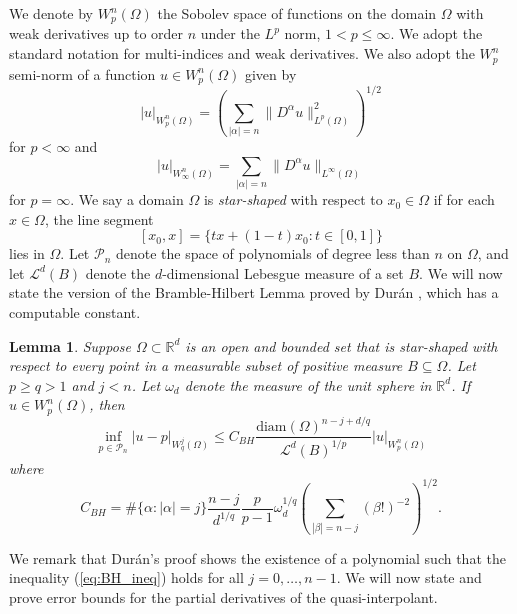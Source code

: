 \documentclass[10pt]{article}
\newtheorem{lemma}[theorem]{Lemma}
\theoremstyle{definition}
\numberwithin{equation}{section}
\numberwithin{figure}{section}
\numberwithin{table}{section}
\begin{document}
We denote by $W^{n}_p(\Omega)$ the Sobolev space of functions on the domain $\Omega$ with weak derivatives up to order $n$ under the $L^p$ norm, $1<p\leq\infty$. We adopt the standard notation for multi-indices and weak derivatives. We also adopt the $W^n_p$ semi-norm of a function $u\in W^n_p(\Omega)$ given by %
$$|u|_{W^n_p(\Omega)}=\left(\sum_{|\alpha|=n}\|D^\alpha u\|_{L^p(\Omega)}^2\right)^{1/2}$$
for $p<\infty$ and 
$$|u|_{W^n_\infty(\Omega)}=\sum_{|\alpha|=n}\|D^\alpha u\|_{L^\infty(\Omega)}$$
for $p=\infty$. We say a domain $\Omega$ is \textit{star-shaped} with respect to $x_0\in\Omega$ if for each $x\in\Omega$, the line segment
$$[x_0,x]=\{tx+(1-t)x_0:t\in[0,1]\}$$
lies in $\Omega$. Let $\mathcal{P}_n$ denote the space of polynomials of degree less than $n$ on $\Omega$, and let $\mathcal{L}^d(B)$ denote the $d$-dimensional Lebesgue measure of a set $B$. We will now state the version of the Bramble-Hilbert Lemma proved by Dur{\'a}n \cite{duran1983polynomial}, which has a computable constant.

\begin{lemma}
\label{lemma:bramble_hilbert}
Suppose $\Omega\subset\mathbb{R}^d$ is an open and bounded set that is star-shaped with respect to every point in a measurable subset of positive measure $B\subseteq\Omega$. Let $p\geq q>1$ and $j<n$. Let $\omega_d$ denote the measure of the unit sphere in $\mathbb{R}^d$. If $u\in W^n_p(\Omega)$, then
\begin{equation}
\inf_{p\in\mathcal{P}_n}|u-p|_{W^j_q(\Omega)}\leq C_{BH}\frac{\mathrm{diam}(\Omega)^{n-j+d/q}}{\mathcal{L}^d(B)^{1/p}}|u|_{W^n_p(\Omega)}
\label{eq:BH_ineq}
\end{equation}
where 
\begin{equation}
C_{BH}=\#\{\alpha:|\alpha|=j\}\frac{n-j}{d^{1/q}}\frac{p}{p-1}\omega_d^{1/q}\left(\sum_{|\beta|=n-j}(\beta!)^{-2}\right)^{1/2}.
\label{eq:BH_constant}
\end{equation}
\end{lemma}

We remark that Dur\'an's proof shows the existence of a polynomial such that the inequality (\ref{eq:BH_ineq}) holds for all $j=0,\dots,n-1$. We will now state and prove error bounds for the partial derivatives of the quasi-interpolant.
\end{document}
